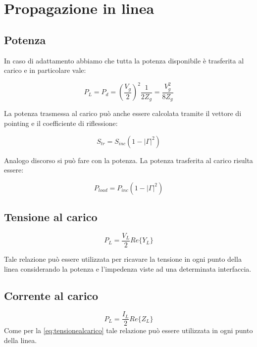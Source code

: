 \chapter{Propagazione in linea}



	\section{Potenza}
		In caso di adattamento abbiamo che tutta la potenza disponibile è trasferita al carico e in particolare vale:
			
			\begin{equation}
			P_L=P_d=(\frac{V_g}{2})^2\frac{1}{2Z_g}=\frac{V_g^2}{8Z_g}
			\end{equation}

			La potenza trasmessa al carico può anche essere calcolata tramite il vettore di pointing e il coefficiente di riflessione:

			\begin{equation}
			S_{tr}=S_{inc}(1-|\Gamma|^2)
			\end{equation}

			Analogo discorso si può fare con la potenza.
			La potenza trasferita al carico risulta essere:

			\begin{equation}
			P_{load}=P_{inc}(1-|\Gamma|^2)
			\end{equation}
	\section{Tensione al carico}

			\begin{equation}
			P_L=\frac{V_{L}}{2}Re\{Y_L\}
			\label{eq:tensionealcarico}
			\end{equation}

			Tale relazione può essere utilizzata per ricavare la tensione in ogni punto della linea considerando la potenza e l'impedenza viste ad una determinata interfaccia.
	\section{Corrente al carico}


			\begin{equation}
			P_L=\frac{I_{L}}{2}Re\{Z_L\}
			\label{eq:correntealcarico}
			\end{equation}
			Come per la \ref{eq:tensionealcarico} tale relazione può essere utilizzata in ogni punto della linea.
